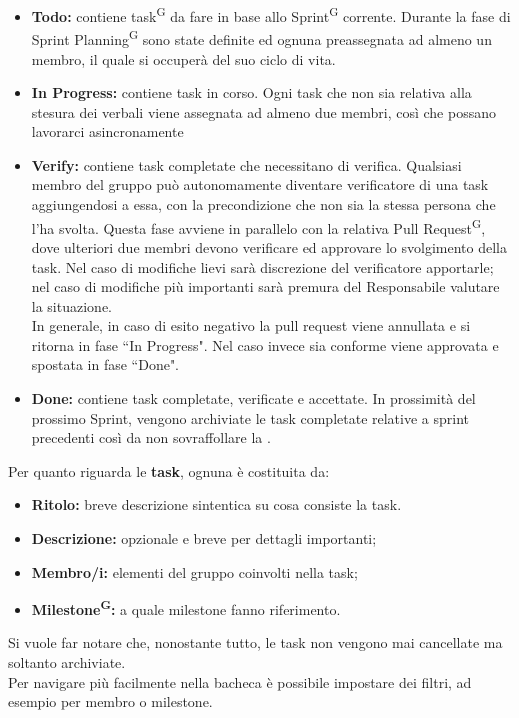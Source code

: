 \documentclass[8pt]{article}
\newcommand{\glossterm}[1]{#1\textsuperscript{G}} %
\begin{document}
\begin{itemize}
    \item \textbf{Todo:} contiene \glossterm{task} da fare in base allo \glossterm{Sprint} corrente. Durante la fase di Sprint \glossterm{Planning} sono state definite ed ognuna preassegnata ad almeno un membro, il quale si occuperà del suo ciclo di vita.
  \item \textbf{In Progress:} contiene task in corso. Ogni task che non sia relativa alla stesura dei verbali viene assegnata ad almeno due membri, così che possano lavorarci asincronamente
  \item \textbf{Verify:} contiene task completate che necessitano di verifica. Qualsiasi membro del
      gruppo può autonomamente diventare verificatore di una task aggiungendosi a essa, con la
        precondizione che non sia la stessa persona che l'ha svolta. Questa fase avviene in
        parallelo con la relativa \glossterm{Pull Request}, dove ulteriori due membri devono verificare ed
        approvare lo svolgimento della task. Nel caso di modifiche lievi sarà discrezione del
        verificatore apportarle; nel caso di modifiche più importanti sarà premura del Responsabile
        valutare la situazione.\\In generale, in caso di esito negativo la pull request viene
        annullata e si ritorna in fase ``In Progress". Nel caso invece sia conforme viene approvata
        e spostata in fase ``Done".
  \item \textbf{Done:} contiene task completate, verificate e accettate. In prossimità del prossimo
      Sprint, vengono archiviate le task completate relative a sprint precedenti così da non sovraffollare la .
\end{itemize}
\medskip
Per quanto riguarda le \textbf{task}, ognuna è costituita da:
\begin{itemize}
  \item \textbf{Ritolo:} breve descrizione sintentica su cosa consiste la task.
  \item \textbf{Descrizione:} opzionale e breve per dettagli importanti;
  \item \textbf{Membro/i:} elementi del gruppo coinvolti nella task;
  \item \textbf{\glossterm{Milestone}:} a quale milestone fanno riferimento.
\end{itemize}
Si vuole far notare che, nonostante tutto, le task non vengono mai cancellate ma soltanto archiviate. \\Per navigare più facilmente nella bacheca è possibile impostare dei filtri, ad esempio per membro o milestone.
\end{document}
